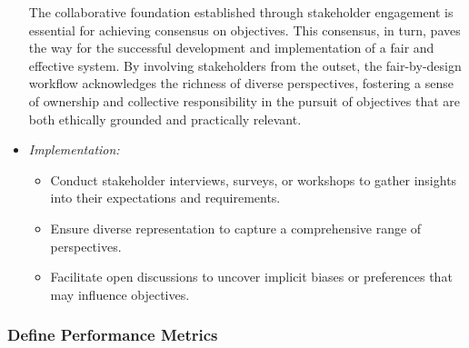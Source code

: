 \documentclass[12pt,a4paper,openright,twoside]{book}
\begin{document}
\begin{itemize}
    The collaborative foundation established through stakeholder engagement is essential for achieving consensus on objectives. This consensus, in turn, paves the way for the successful development and implementation of a fair and effective system. By involving stakeholders from the outset, the fair-by-design workflow acknowledges the richness of diverse perspectives, fostering a sense of ownership and collective responsibility in the pursuit of objectives that are both ethically grounded and practically relevant.
    
    \item \emph{Implementation:}

        \begin{itemize}
            
            \item Conduct stakeholder interviews, surveys, or workshops to gather insights into their expectations and requirements.
            
            \item Ensure diverse representation to capture a comprehensive range of perspectives.
            
            \item Facilitate open discussions to uncover implicit biases or preferences that may influence objectives.
        
        \end{itemize}

\end{itemize}

\subsubsection{Define Performance Metrics}
\end{document}
